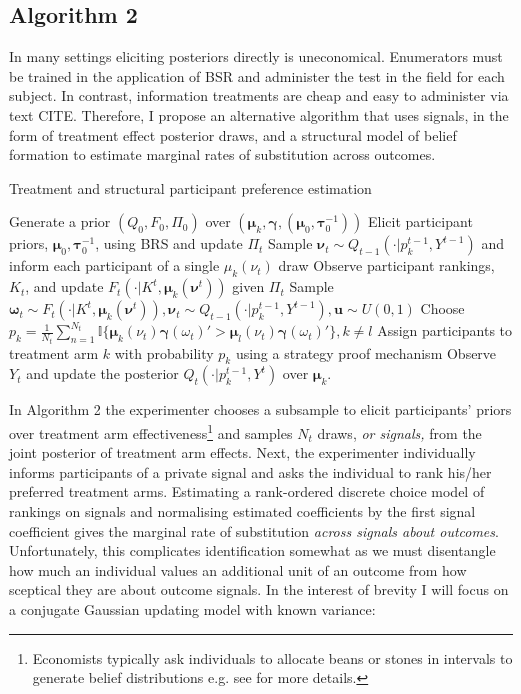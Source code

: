 \documentclass[twoside,11pt]{article}
\begin{document}
\subsection{Algorithm 2}
In many settings eliciting posteriors directly is uneconomical. Enumerators must 
be trained in the application of BSR and administer the test in the field for 
each subject. In contrast, information treatments are cheap and easy to administer 
via text CITE. Therefore, I propose an alternative algorithm that uses signals, 
in the form of treatment effect posterior draws, 
and a structural model of belief formation to estimate marginal rates of 
substitution across outcomes.

\begin{algorithm}
  \caption{Treatment and structural participant preference estimation }\label{alg:cap}
  \begin{algorithmic}
  \State Generate a prior $(Q_0, F_0, \Pi_0)$ over $\left(\bm{\mu}_k, \bm{\gamma}, (\bm{\mu}_0, \bm{\tau}_0^{-1})\right)$
  \State Elicit participant priors, $\bm{\mu}_0, \bm{\tau}_0^{-1}$, using BRS and update $\Pi_t$
  \EndIf
  \State Sample $\bm{\nu}_{t} \sim Q_{t-1}(\cdot | p_{k}^{t-1}, Y^{t-1})$ and inform each 
  participant of a single $\mu_k(\nu_{t})$ draw
  \State Observe participant rankings, $K_t$, and update $F_{t}( \cdot | K^{t}, \bm{\mu}_k(\bm{\nu}^{t}))$ 
  given $\Pi_t$
  \State Sample $\bm{\omega}_{t} \sim F_{t}( \cdot | K^{t}, \bm{\mu}_k(\bm{\nu}^{t})), \bm{\nu}_t \sim Q_{t-1}(\cdot | p_{k}^{t-1}, Y^{t-1}), \bm{u} \sim U(0,1)$ 
  \State Choose $p_k = \frac{1}{N_t} 
  \sum^{N_t}_{n=1} \mathbb{I}\{\bm{\mu}_k(\nu_{t}) \bm{\gamma}(\omega_{t})' > \bm{\mu}_l(\nu_{t}) \bm{\gamma}(\omega_{t})'\}, k \neq l$ 
  \State Assign participants to treatment arm $k$ with probability $p_{k}$ using a strategy proof mechanism
  \State Observe $Y_t$ and update the posterior $Q_{t}(\cdot | p_k^{t-1}, Y^{t})$ over $\bm{\mu}_k$. 
  \EndFor
  \end{algorithmic}
  \end{algorithm}

In Algorithm 2 the experimenter chooses a subsample to elicit participants'
 priors over treatment arm 
effectiveness\footnote{Economists typically ask individuals to allocate beans or 
stones in intervals to generate belief distributions e.g. see \cite{ar-delavande} for more details.}
and samples $N_t$ draws, \emph{or signals,} from the joint posterior of treatment arm effects. 
Next, the experimenter individually informs participants of a private signal
and asks the individual to rank his/her preferred treatment arms. Estimating a 
rank-ordered discrete choice model of rankings on signals and normalising 
estimated coefficients by the first signal coefficient gives the marginal  
rate of substitution \emph{across signals about outcomes}. Unfortunately, this 
complicates identification somewhat as we must disentangle how much an individual 
values an additional unit of an outcome from how sceptical they are about 
outcome signals. In the interest of brevity I will focus on a conjugate Gaussian 
updating model with known variance: 
\end{document}
